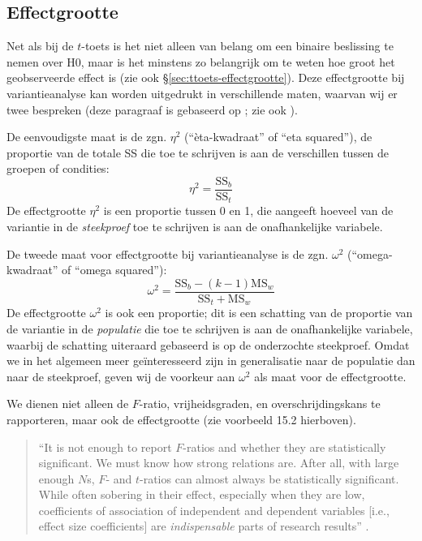 \documentclass[
]{book}
\begin{document}
\hypertarget{sec:anova-oneway-effectgrootte}{%
\subsection{Effectgrootte}\label{sec:anova-oneway-effectgrootte}}

Net als bij de \(t\)-toets is het niet alleen van belang om een binaire beslissing
te nemen over H0, maar is het minstens zo belangrijk om te weten hoe
groot het geobserveerde effect is (zie ook
§\ref{sec:ttoets-effectgrootte}). Deze effectgrootte bij
variantieanalyse kan worden uitgedrukt in verschillende maten, waarvan
wij er twee bespreken (deze paragraaf is gebaseerd op \citet{KL00}; zie ook \citet{Olej03}).

De eenvoudigste maat is de zgn. \(\eta^2\) (``èta-kwadraat'' of ``eta
squared''), de proportie van de totale SS die toe te schrijven is aan de
verschillen tussen de groepen of condities: \[\label{eq:etasq}
    \eta^2 = \frac{ \textrm{SS}_b } { \textrm{SS}_t }\] De effectgrootte
\(\eta^2\) is een proportie tussen 0 en 1, die aangeeft hoeveel van de
variantie in de \emph{steekproef} toe te schrijven is aan de onafhankelijke
variabele.

De tweede maat voor effectgrootte bij variantieanalyse is de zgn.
\(\omega^2\) (``omega-kwadraat'' of ``omega squared''):
\begin{equation}
  \label{eq:omegasq}
    \omega^2 = \frac{ \textrm{SS}_b - (k-1) \textrm{MS}_w} { \textrm{SS}_t + \textrm{MS}_w }
\end{equation}
De effectgrootte \(\omega^2\) is ook een proportie; dit is een schatting
van de proportie van de variantie in de \emph{populatie} die toe te schrijven
is aan de onafhankelijke variabele, waarbij de schatting uiteraard
gebaseerd is op de onderzochte steekproef. Omdat we in het algemeen meer
geïnteresseerd zijn in generalisatie naar de populatie dan naar de
steekproef, geven wij de voorkeur aan \(\omega^2\) als maat voor de
effectgrootte.

We dienen niet alleen de \(F\)-ratio, vrijheidsgraden, en
overschrijdingskans te rapporteren, maar ook de effectgrootte (zie
voorbeeld 15.2 hierboven).

\begin{quote}
``It is not enough to report
\(F\)-ratios and whether they are statistically significant. We must know
how strong relations are. After all, with large enough \(N\)s, \(F\)- and
\(t\)-ratios can almost always be statistically significant. While often
sobering in their effect, especially when they are low, coefficients of
association of independent and dependent variables {[}i.e., effect size
coefficients{]} are \emph{indispensable} parts of research results'' \citep[ p.327, nadruk toegevoegd]{KL00}.
\end{quote}
\end{document}
